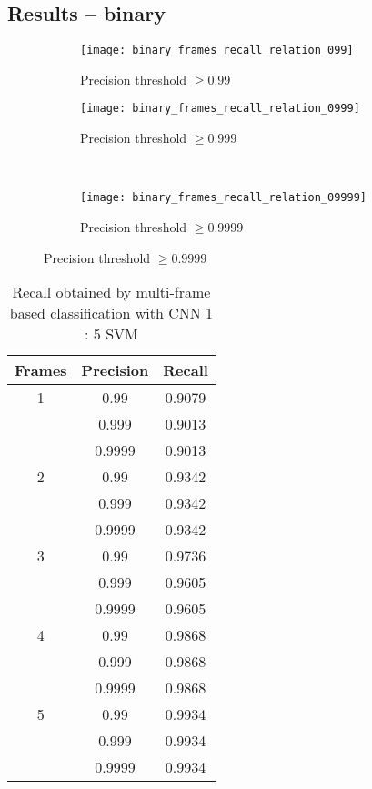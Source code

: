    \subsection{Results -- binary}

    \begin{figure}[H]
        \centering
        \caption{Frames-accuracy relation for binary problem}
        \begin{subfigure}[b]{0.48\textwidth}
            \raggedleft
            \caption{Precision threshold $\geqslant 0.99$}
            \texttt{[image: binary\_frames\_recall\_relation\_099]}
        \end{subfigure}
        \hspace*{\fill}
        \begin{subfigure}[b]{0.48\textwidth}
            \raggedright
            \caption{Precision threshold $\geqslant 0.999$}
            \texttt{[image: binary\_frames\_recall\_relation\_0999]}
        \end{subfigure}\\
        \vspace{5mm}
        \begin{subfigure}[b]{0.48\textwidth}
            \centering
            \caption{Precision threshold $\geqslant 0.9999$}
            \texttt{[image: binary\_frames\_recall\_relation\_09999]}
        \end{subfigure}
    \end{figure}
    \newpage


    \begin{table}[H]
    \begin{center}
    \small
    \caption{Recall obtained by multi-frame based classification with CNN 1 : 5 SVM}
    \begin{tabular}{ |c|c|c| }
        \hline
        Frames & Precision & Recall\\
    \hline
    1 & 0.99 & 0.9079\\
    & 0.999 & 0.9013\\
    & 0.9999 & 0.9013\\
    \hline
    2 & 0.99 & 0.9342\\
    & 0.999 & 0.9342\\
    & 0.9999 & 0.9342\\
    \hline
    3 & 0.99 & 0.9736\\
    & 0.999 & 0.9605\\
    & 0.9999 & 0.9605\\
    \hline
    4 & 0.99 & 0.9868\\
    & 0.999 & 0.9868\\
    & 0.9999 & 0.9868\\
    \hline
    5 & 0.99 & 0.9934\\
    & 0.999 & 0.9934\\
    & 0.9999 & 0.9934\\
    \hline

    \end{tabular}
    \end{center}
    \end{table}

